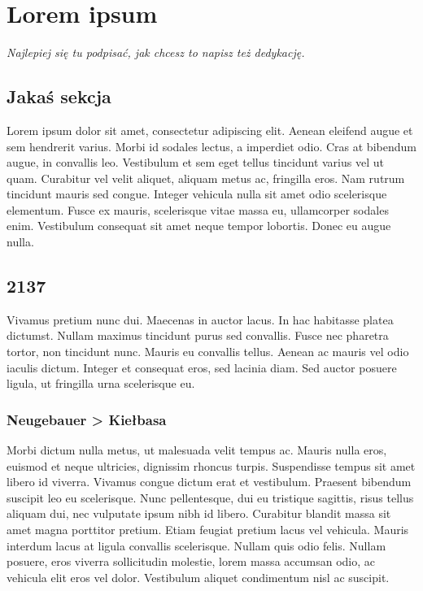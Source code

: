 \renewcommand{\autor}{Jan Kowalski}
\chapter{Lorem ipsum}
\textit{Najlepiej się tu podpisać, jak chcesz to napisz też dedykację.}
\section{Jakaś sekcja}
Lorem ipsum dolor sit amet, consectetur adipiscing elit. Aenean eleifend augue et sem hendrerit varius. Morbi id sodales lectus, a imperdiet odio. Cras at bibendum augue, in convallis leo. Vestibulum et sem eget tellus tincidunt varius vel ut quam. Curabitur vel velit aliquet, aliquam metus ac, fringilla eros. Nam rutrum tincidunt mauris sed congue. Integer vehicula nulla sit amet odio scelerisque elementum. Fusce ex mauris, scelerisque vitae massa eu, ullamcorper sodales enim. Vestibulum consequat sit amet neque tempor lobortis. Donec eu augue nulla.
\section{2137}
Vivamus pretium nunc dui. Maecenas in auctor lacus. In hac habitasse platea dictumst. Nullam maximus tincidunt purus sed convallis. Fusce nec pharetra tortor, non tincidunt nunc. Mauris eu convallis tellus. Aenean ac mauris vel odio iaculis dictum. Integer et consequat eros, sed lacinia diam. Sed auctor posuere ligula, ut fringilla urna scelerisque eu.
\subsection{Neugebauer > Kiełbasa}
Morbi dictum nulla metus, ut malesuada velit tempus ac. Mauris nulla eros, euismod et neque ultricies, dignissim rhoncus turpis. Suspendisse tempus sit amet libero id viverra. Vivamus congue dictum erat et vestibulum. Praesent bibendum suscipit leo eu scelerisque. Nunc pellentesque, dui eu tristique sagittis, risus tellus aliquam dui, nec vulputate ipsum nibh id libero. Curabitur blandit massa sit amet magna porttitor pretium. Etiam feugiat pretium lacus vel vehicula. Mauris interdum lacus at ligula convallis scelerisque. Nullam quis odio felis. Nullam posuere, eros viverra sollicitudin molestie, lorem massa accumsan odio, ac vehicula elit eros vel dolor. Vestibulum aliquet condimentum nisl ac suscipit.
